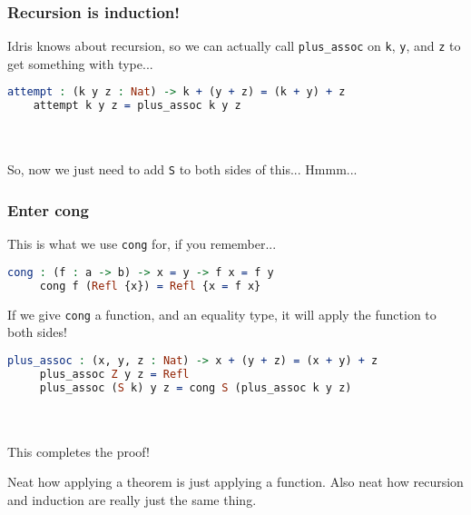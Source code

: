 \documentclass{beamer}
\begin{document}
\begin{frame}[fragile]
  \frametitle{Recursion is induction!}

  Idris knows about recursion, so we can actually call
  \texttt{plus\_assoc} on \texttt{k}, \texttt{y}, and \texttt{z} to get
  something with type...

  \begin{lstlisting}[language=Idris]
    attempt : (k y z : Nat) -> k + (y + z) = (k + y) + z
    attempt k y z = plus_assoc k y z
  \end{lstlisting}

  \pause \\~\\

  So, now we just need to add \texttt{S} to both sides of this... Hmmm...
\end{frame}

\begin{frame}[fragile]
  \frametitle{Enter cong}

  This is what we use \texttt{cong} for, if you remember...

  \begin{lstlisting}[language=Idris]
     cong : (f : a -> b) -> x = y -> f x = f y
     cong f (Refl {x}) = Refl {x = f x}
   \end{lstlisting}

   \pause
   If we give \texttt{cong} a function, and an equality type, it will apply the function to both sides!

   \pause
   \begin{lstlisting}[language=Idris]
     plus_assoc : (x, y, z : Nat) -> x + (y + z) = (x + y) + z
     plus_assoc Z y z = Refl
     plus_assoc (S k) y z = cong S (plus_assoc k y z)
   \end{lstlisting}

   \pause \\~\\
   This completes the proof!

   \pause

   Neat how applying a theorem is just applying a function. Also neat
   how recursion and induction are really just the same thing.
\end{frame}
\end{document}
